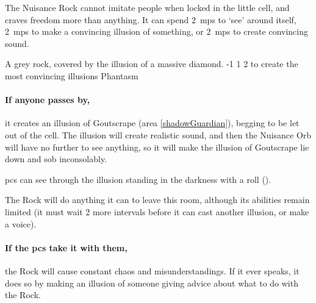 The Nuisance Rock cannot imitate people when locked in the little cell, and craves freedom more than anything.
It can spend 2~\glspl{mp} to `see' around itself, 2~\glspl{mp} to make a convincing illusion of something, or 2~\glspl{mp} to create convincing sound.

  {A grey rock, covered by the illusion of a massive diamond.}%
  {-1}%
  {1}%
  {2}%
  {to create the most convincing illusions}%
  {Phantasm}%
  {
    \setcounter{Fire}{3}
    \setcounter{Earth}{2}
    \setcounter{Fate}{1}
    \setcounter{Water}{1}
    \setcounter{Academics}{2}
    \setcounter{Wyldcrafting}{1}
  }%

\showStdSpells[
  \setcounter{diceNo}{0}
]

\paragraph{If anyone passes by,}
it creates an illusion of Goutscrape (area \vref{shadowGuardian}), begging to be let out of the cell.
The illusion will create realistic sound, and then the Nuisance Orb will have no further  to see anything, so it will make the illusion of Goutscrape lie down and sob inconsolably.

\Glspl{pc} can see through the illusion standing in the darkness with a  roll
(\tn[12]).

The Rock will do anything it can to leave this room, although its abilities remain limited (it must wait 2 more \glspl{interval} before it can cast another illusion, or make a voice).

\paragraph{If the \glspl{pc} take it with them,}
the Rock will cause constant chaos and misunderstandings.
If it ever speaks, it does so by making an illusion of someone giving advice about what to do with the Rock.

